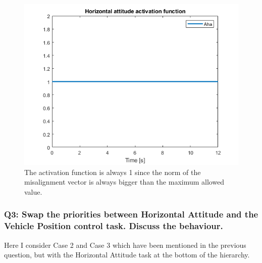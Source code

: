 \documentclass{article}
\begin{document}
\begin{figure}[H]
	\centering
	\includegraphics[width=0.7\linewidth]{images/Ex1/HorAtt_Enabled_DifferentStartpos_DifferentEndpos_ActivFunct}
	\caption{The activation function is always 1 since the norm of the misalignment vector is always bigger than the maximum allowed value.}
	\label{fig:q2case3d}
\end{figure}


\subsubsection{Q3: Swap the priorities between Horizontal Attitude and the Vehicle Position control task. Discuss the behaviour.}
Here I consider Case 2 and Case 3 which have been mentioned in the previous question, but with the Horizontal Attitude task at the bottom of the hierarchy.
\end{document}
